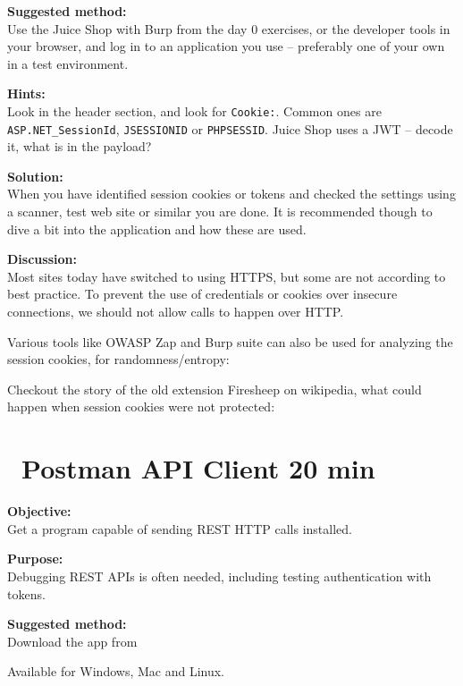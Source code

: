\documentclass[a4paper,11pt,notitlepage]{report}
\begin{document}
{\bf Suggested method:}\\
Use the Juice Shop with Burp from the day 0 exercises, or the developer tools in your browser, and log in to an application you use -- preferably one of your own in a test environment.

{\bf Hints:}\\
Look in the header section, and look for \verb+Cookie:+. Common ones are \verb+ASP.NET_SessionId+, \verb+JSESSIONID+ or \verb+PHPSESSID+. Juice Shop uses a JWT -- decode it, what is in the payload?

{\bf Solution:}\\
When you have identified session cookies or tokens and checked the settings using a scanner, test web site or similar you are done. It is recommended though to dive a bit into the application and how these are used.

{\bf Discussion:}\\
Most sites today have switched to using HTTPS, but some are not according to best practice. To prevent the use of credentials or cookies over insecure connections, we should not allow calls to happen over HTTP.

Various tools like OWASP Zap and Burp suite can also be used for analyzing the session cookies, for randomness/entropy:\\

Checkout the story of the old extension Firesheep on wikipedia, what could happen when session cookies were not protected:\\


\chapter{\faInfoCircle\ Postman API Client 20 min}
\label{ex:postman-api}

{\bf Objective:}\\
Get a program capable of sending REST HTTP calls installed.

{\bf Purpose:}\\
Debugging REST APIs is often needed, including testing authentication with tokens.

{\bf Suggested method:}\\
Download the app from

Available for Windows, Mac and Linux.
\end{document}

